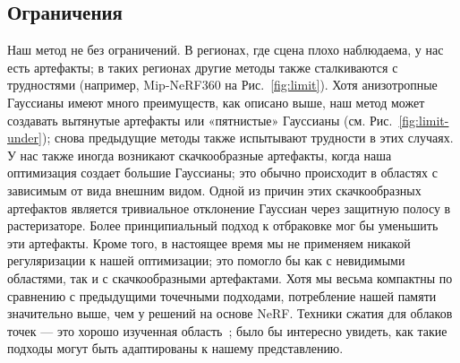 \subsection{Ограничения}
Наш метод не без ограничений.
В регионах, где сцена плохо наблюдаема, у нас есть артефакты; в таких регионах другие методы также сталкиваются с трудностями (например, Mip-NeRF360 на Рис.~\ref{fig:limit}). 
Хотя анизотропные Гауссианы имеют много преимуществ, как описано выше,
наш метод может создавать вытянутые артефакты или «пятнистые» Гауссианы (см. Рис.~\ref{fig:limit-under}); снова предыдущие методы также испытывают трудности в этих случаях.
У нас также иногда возникают скачкообразные артефакты, когда наша оптимизация создает большие Гауссианы; это обычно происходит в областях с зависимым от вида внешним видом.
Одной из причин этих скачкообразных артефактов является тривиальное отклонение Гауссиан через защитную полосу в растеризаторе. Более принципиальный подход к отбраковке мог бы уменьшить эти артефакты. 
Кроме того, в настоящее время мы не применяем никакой регуляризации к нашей оптимизации; это помогло бы как с невидимыми областями, так и с скачкообразными артефактами.
Хотя мы весьма компактны по сравнению с предыдущими точечными подходами, потребление нашей памяти значительно выше, чем у решений на основе NeRF.  Техники сжатия для облаков точек — это хорошо изученная область~\cite{de2016compression}; было бы интересно увидеть, как такие подходы могут быть адаптированы к нашему представлению.

